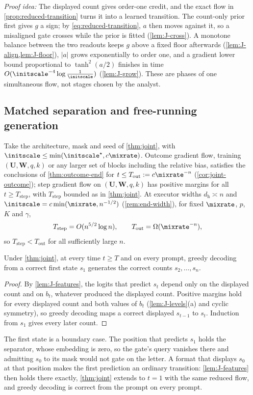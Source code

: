 \emph{Proof idea:} The displayed count gives order-one credit, and the exact flow in \cref{prop:reduced-transition} turns it into a
learned transition. The count-only prior first gives $g$ a sign; by \cref{eq:reduced-transition}, $a$ then moves against it, so a misaligned gate crosses while the prior is fitted
(\cref{lem:J-cross}). A monotone balance between the two readouts keeps $g$ above a fixed floor afterwards (\cref{lem:J-align,lem:J-floor}),
$|a|$ grows exponentially to order one, and a gradient lower bound proportional to $\tanh^2(a/2)$ finishes in time
$O(\initscale^{-4}\log\frac1\initscale)$ (\cref{lem:J-grow}). These are phases of one simultaneous flow, not stages chosen by the analyst.

\subsection{Matched separation and free-running generation}

\begin{corollary}
\label{cor:matched}
Take the architecture, mask and seed of \cref{thm:joint}, with $\initscale\le\min(\initscale^\star,c\mixrate)$. Outcome gradient flow, training
$(\mathbf U,\mathbf W,q,k)$ or any larger set of blocks including the relative bias, satisfies the conclusions of \cref{thm:outcome-end} for
$t\le T_{\mathrm{out}}:=c\mixrate^{-n}$ (\cref{cor:joint-outcome}); step gradient flow on $(\mathbf U,\mathbf W,q,k)$ has positive margins for all
$t\ge T_{\mathrm{step}}$, with $T_{\mathrm{step}}$ bounded as in \cref{thm:joint}. At executor widths $d_{\mathrm h}\asymp n$ and
$\initscale=c\min(\mixrate,n^{-1/2})$ (\cref{rem:end-width}), for fixed $\mixrate$, $p$, $K$ and $\gamma$,
\[
 T_{\mathrm{step}}=O(n^{5/2}\log n),\qquad T_{\mathrm{out}}=\Omega(\mixrate^{-n}),
\]
so $T_{\mathrm{step}}<T_{\mathrm{out}}$ for all sufficiently large $n$.
\end{corollary}

\begin{corollary}
\label{cor:free-running}
Under \cref{thm:joint}, at every time $t\ge T$ and on every prompt, greedy decoding from a correct first state $s_1$ generates the correct
counts $s_2,\ldots,s_n$.
\end{corollary}
\begin{proof}
By \cref{lem:J-features}, the logits that predict $s_t$ depend only on the displayed count and on $b_t$, whatever produced the displayed
count. Positive margins hold for every displayed count and both values of $b_t$ (\cref{lem:J-levels}(a) and cyclic symmetry), so greedy
decoding maps a correct displayed $s_{t-1}$ to $s_t$. Induction from $s_1$ gives every later count.
\end{proof}
The first state is a boundary case. The position that predicts $s_1$ holds the separator, whose embedding is zero, so the gate's query
vanishes there and admitting $s_0$ to its mask would not gate on the letter. A format that displays $s_0$ at that position makes the first
prediction an ordinary transition: \cref{lem:J-features} then holds there exactly, \cref{thm:joint} extends to $t=1$ with the same reduced
flow, and greedy decoding is correct from the prompt on every prompt.

